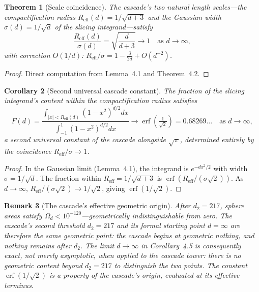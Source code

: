 \documentclass[11pt,a4paper]{article}
\newtheorem{theorem}{Theorem}[section]
\newtheorem{corollary}[theorem]{Corollary}
\newtheorem{remark}[theorem]{Remark}
\begin{document}
\begin{theorem}[Scale coincidence]
The cascade's two natural length scales---the compactification radius $R_{\mathrm{eff}}(d) = 1/\sqrt{d+3}$ and the Gaussian width $\sigma(d) = 1/\sqrt{d}$ of the slicing integrand---satisfy
\[
\frac{R_{\mathrm{eff}}(d)}{\sigma(d)} = \sqrt{\frac{d}{d+3}} \to 1 \quad\text{as } d\to\infty,
\]
with correction $O(1/d)$: $R_{\mathrm{eff}}/\sigma = 1 - \frac{3}{2d} + O(d^{-2})$.
\end{theorem}

\begin{proof}
Direct computation from Lemma~4.1 and Theorem~4.2.
\end{proof}

\begin{corollary}[Second universal cascade constant]
The fraction of the slicing integrand's content within the compactification radius satisfies
\[
F(d) = \frac{\int_{|x|<R_{\mathrm{eff}}(d)}(1-x^2)^{d/2}dx}{\int_{-1}^{1}(1-x^2)^{d/2}dx} \to \operatorname{erf}\!\left(\tfrac{1}{\sqrt{2}}\right) = 0.68269\ldots \quad\text{as }d\to\infty,
\]
a second universal constant of the cascade alongside $\sqrt{\pi}$, determined entirely by the coincidence $R_{\mathrm{eff}}/\sigma\to 1$.
\end{corollary}

\begin{proof}
In the Gaussian limit (Lemma~4.1), the integrand is $e^{-dx^2/2}$ with width $\sigma = 1/\sqrt{d}$.
The fraction within $R_{\mathrm{eff}} = 1/\sqrt{d+3}$ is $\operatorname{erf}(R_{\mathrm{eff}}/(\sigma\sqrt{2}))$. As $d\to\infty$, $R_{\mathrm{eff}}/(\sigma\sqrt{2})\to 1/\sqrt{2}$, giving $\operatorname{erf}(1/\sqrt{2})$.
\end{proof}

\begin{remark}[The cascade's effective geometric origin]
After $d_2 = 217$, sphere areas satisfy $\Omega_d < 10^{-120}$---geometrically indistinguishable from zero. The cascade's second threshold $d_2 = 217$ and its formal starting point $d=\infty$ are therefore the same geometric point: the cascade begins at geometric nothing, and nothing remains after $d_2$. The limit $d\to\infty$ in Corollary~4.5 is consequently exact, not merely asymptotic, when applied to the cascade tower: there is no geometric content beyond $d_2 = 217$ to distinguish the two points. The constant $\operatorname{erf}(1/\sqrt{2})$ is a property of the cascade's origin, evaluated at its effective terminus.
\end{remark}
\end{document}

